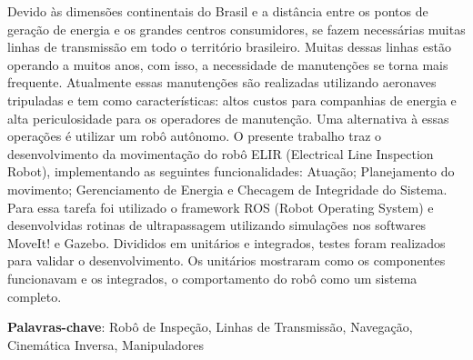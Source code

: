 \begin{thesisresumo}
Devido às dimensões continentais do Brasil e a distância entre os pontos de geração de energia e os grandes centros consumidores, se fazem necessárias muitas linhas de transmissão em todo o território brasileiro. Muitas dessas linhas estão operando a muitos anos, com isso, a necessidade de manutenções se torna mais frequente. Atualmente essas manutenções são realizadas utilizando aeronaves tripuladas e tem como características: altos custos para companhias de energia e alta periculosidade para os operadores de manutenção. Uma alternativa à essas operações é utilizar um robô autônomo.
O presente trabalho traz o desenvolvimento da movimentação do robô ELIR (Electrical Line Inspection Robot), implementando as seguintes funcionalidades: Atuação; Planejamento do movimento; Gerenciamento de Energia e Checagem de Integridade do Sistema. Para essa tarefa foi utilizado o framework ROS (Robot Operating System) e desenvolvidas rotinas de ultrapassagem utilizando simulações nos softwares MoveIt! e Gazebo. Divididos em unitários e integrados, testes foram realizados para validar o desenvolvimento. Os unitários mostraram como os componentes funcionavam e os integrados, o comportamento do robô como um sistema completo.   





\textbf{Palavras-chave}: Robô de Inspeção, Linhas de Transmissão, Navegação, Cinemática Inversa, Manipuladores

\end{thesisresumo}
